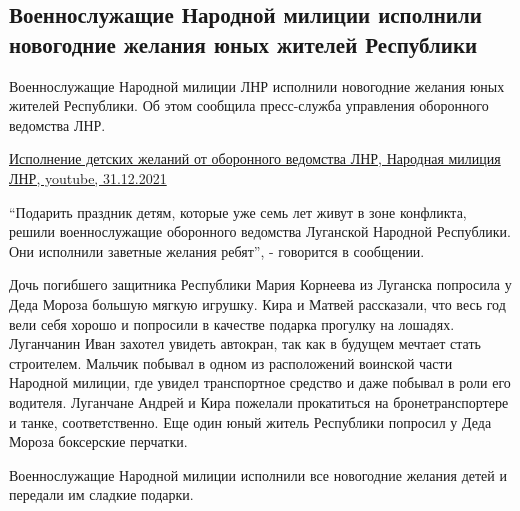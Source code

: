  
 
 
 
 
\subsection{Военнослужащие Народной милиции исполнили новогодние желания юных жителей Республики}
\label{sec:31_12_2021.stz.news.lnr.lug_info.2.nm_lnr_deti_podarki}


Военнослужащие Народной милиции ЛНР исполнили новогодние желания юных жителей
Республики. Об этом сообщила пресс-служба управления оборонного ведомства ЛНР.

\href{https://www.youtube.com/watch?v=68fsZ-leq40}{%
Исполнение детских желаний от оборонного ведомства ЛНР, Народная милиция ЛНР, youtube, 31.12.2021%
}


\enquote{Подарить праздник детям, которые уже семь лет живут в зоне конфликта, решили
военнослужащие оборонного ведомства Луганской Народной Республики. Они
исполнили заветные желания ребят}, - говорится в сообщении.


Дочь погибшего защитника Республики Мария Корнеева из Луганска попросила у Деда
Мороза большую мягкую игрушку. Кира и Матвей рассказали, что весь год вели себя
хорошо и попросили в качестве подарка прогулку на лошадях. Луганчанин Иван
захотел увидеть автокран, так как в будущем мечтает стать строителем. Мальчик
побывал в одном из расположений воинской части Народной милиции, где увидел
транспортное средство и даже побывал в роли его водителя. Луганчане Андрей и
Кира пожелали прокатиться на бронетранспортере и танке, соответственно. Еще
один юный житель Республики попросил у Деда Мороза боксерские перчатки.


Военнослужащие Народной милиции исполнили все новогодние желания детей и
передали им сладкие подарки.

